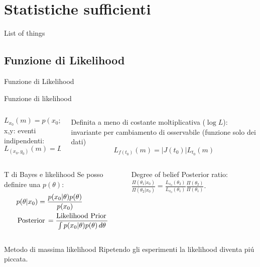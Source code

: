 \section{Statistiche sufficienti}

\begin{frame}[allowframebreaks]{List of things}
\printbibliography[keyword={inference},heading=beamer]
\listofkeywords
\end{frame}

\subsection{Funzione di Likelihood}

\begin{frame}{Funzione di Likelihood}
\begin{block}{Funzione di likelihood}
\begin{columns}[T]
	\begin{column}{0.5\textwidth}
		\[L_{x_0}(m)=p(x_0;m)\]
		x,y: eventi indipendenti:
		\[L_{(x_0,y_0)}(m)=L_{x_0}(m)L_{y_0}(m)\]
	\end{column}
	\begin{column}{0.5\textwidth}
		Definita a meno di costante moltiplicativa ($\log{L}$): invariante per cambiamento di osservabile (funzione solo dei dati)
		\[L_{f(t_0)}(m)=|J(t_0)|L_{t_0}(m)\]
	\end{column}
\end{columns}
\end{block}
\begin{columns}[T]
\begin{column}{0.5\textwidth}
	\begin{block}{T di Bayes e likelihood}
		Se posso definire una $p(\theta)$:
		\begin{align*}
		&p(\theta|x_0)=\frac{p(x_0|\theta)p(\theta)}{p(x_0)}\\
		&\operatorname{Posterior}{}=\frac{\operatorname{Likelihood}{}\operatorname{Prior}{}}{\int p(x_0|\theta)p(\theta)\,d\theta}
		\end{align*}
	\end{block}
\end{column}
\begin{column}{0.5\textwidth}
	\begin{block}{Degree of belief}
		Posterior ratio: $\frac{\Pi(\theta_1|x_0)}{\Pi(\theta_2|x_0)}=\frac{L_{x_0}(\theta_2)}{L_{x_0}(\theta_1)}\frac{\Pi(\theta_2)}{\Pi(\theta_1)}$.
	\end{block}
\end{column}
\end{columns}
\begin{block}{Metodo di massima likelihood}
Ripetendo gli esperimenti la likelihood diventa pi\'u piccata.
\end{block}
\end{frame}

